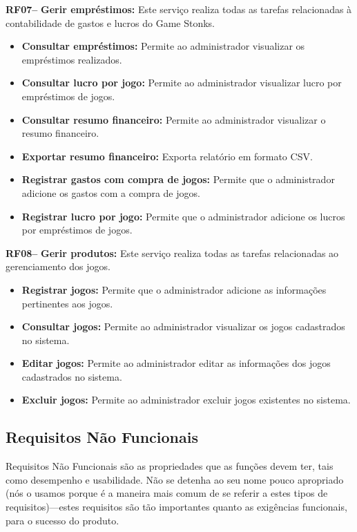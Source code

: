 \documentclass[a4paper, 12pt]{article}
\begin{document}
\textbf{RF07--} \textbf{Gerir empréstimos:} Este serviço realiza todas as tarefas relacionadas à contabilidade de gastos e lucros do Game Stonks.
\begin{itemize}
    \item \textbf{Consultar empréstimos:} Permite ao administrador visualizar os empréstimos realizados.
    \item \textbf{Consultar lucro por jogo:} Permite ao administrador visualizar lucro por empréstimos de jogos.
    \item \textbf{Consultar resumo financeiro:} Permite ao administrador visualizar o resumo financeiro.
    \item \textbf{Exportar resumo financeiro:} Exporta relatório em formato CSV.
    \item \textbf{Registrar gastos com compra de jogos:} Permite que o administrador adicione os gastos com a compra de jogos.
    \item \textbf{Registrar lucro por jogo:} Permite que o administrador adicione os lucros por empréstimos de jogos.
\end{itemize}

\textbf{RF08--} \textbf{Gerir produtos:} Este serviço realiza todas as tarefas relacionadas ao gerenciamento dos jogos.
\begin{itemize}
    \item \textbf{Registrar jogos:} Permite que o administrador adicione as informações pertinentes aos jogos.
    \item \textbf{Consultar jogos:} Permite ao administrador visualizar os jogos cadastrados no sistema.
    \item \textbf{Editar jogos:} Permite ao administrador editar as informações dos jogos cadastrados no sistema.
    \item \textbf{Excluir jogos:} Permite ao administrador excluir jogos existentes no sistema.
\end{itemize}

\subsection{Requisitos Não Funcionais}

Requisitos Não Funcionais são as propriedades que as funções devem ter, tais como desempenho e usabilidade. Não se detenha ao seu nome pouco apropriado (nós o usamos porque é a maneira mais comum de se referir a estes tipos de requisitos)—estes requisitos são tão importantes quanto as exigências funcionais, para o sucesso do produto.
\end{document}
